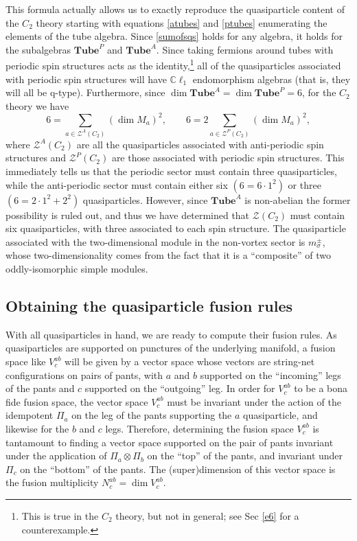 \documentclass[12pt,a4paper]{article}
\newcommand{\tp}{\otimes}
\newcommand{\mcz}{\mathcal{Z}}
\newcommand\be            {\begin{equation}}
\newcommand\ee            {\end{equation}}
\newcommand{\cl}{\mathbb{C}\ell}
\newcommand{\tube}{\textbf{Tube}}
\begin{document}
This formula actually allows us to exactly reproduce the quasiparticle content of the $C_2$ theory starting with equations \eqref{atubes} and \eqref{ptubes} enumerating the elements of the tube algebra. Since \eqref{sumofsqs} holds for any algebra, it holds for the subalgebras $\tube^P$ and $\tube^A$. Since taking fermions around tubes with periodic spin structures acts as the identity,\footnote{This is true in the $C_2$ theory, but not in general; see Sec \ref{e6} for a counterexample.} all of the quasiparticles associated with periodic spin structures will have $\cl_1$ endomorphism algebras (that is, they will all be q-type). Furthermore, since $\dim \tube^A = \dim \tube^P = 6$, for the $C_2$ theory we have 
\be 6 = \sum_{a \in \mcz^A(C_2)} (\dim M_a)^2,\qquad 6 = 2 \sum_{a\in \mcz^P(C_2)} (\dim M_a)^2,\ee
where $\mcz^A(C_2)$ are all the quasiparticles associated with anti-periodic spin structures and $\mcz^P(C_2)$ are those associated with periodic spin structures. This immediately tells us that the periodic sector must contain three quasiparticles, while the anti-periodic sector must contain either six $(6 = 6\cdot 1^2)$ or three $(6=2\cdot 1^2 + 2^2)$ quasiparticles. However, since $\tube^A$ is non-abelian the former possibility is ruled out, and thus we have determined that $\mcz(C_2)$ must contain six quasiparticles, with three associated to each spin structure. The quasiparticle associated with the two-dimensional module in the non-vortex sector is $m_\sigma^\pm$, whose two-dimensionality comes from the fact that it is a ``composite'' of two oddly-isomorphic simple modules. 


\subsection{Obtaining the quasiparticle fusion rules} \label{fusion}

With all quasiparticles in hand, we are ready to compute their fusion rules. As quasiparticles are supported on punctures of the underlying manifold, a fusion space like $V^{ab}_c$ will be given by a vector space whose vectors are string-net configurations on pairs of pants, with $a$ and $b$ supported on the ``incoming'' legs of the pants and $c$ supported on the ``outgoing'' leg. In order for $V^{ab}_c$ to be a bona fide fusion space, the vector space $V^{ab}_c$ must be invariant under the action of the idempotent $\Pi_a$ on the leg of the pants supporting the $a$ quasiparticle, and likewise for the $b$ and $c$ legs. Therefore, determining the fusion space $V^{ab}_c$ is tantamount to finding a vector space supported on the pair of pants invariant under the application of $\Pi_a\tp \Pi_b$ on the ``top'' of the pants, and invariant under $\Pi_c$ on the ``bottom'' of the pants. The (super)dimension of this vector space is the fusion multiplicity $N^{ab}_c = \dim V^{ab}_c$. 
\end{document}
